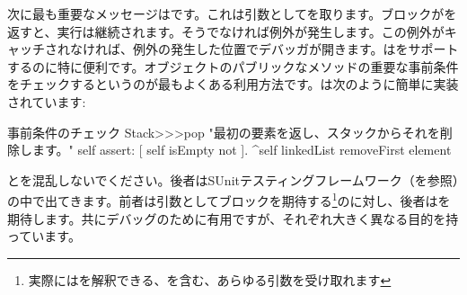 \documentclass[a4paper,10pt,twoside]{book}
\begin{document}

次に最も重要なメッセージはです。これは引数としてを取ります。ブロックがを返すと、実行は継続されます。そうでなければ例外が発生します。この例外がキャッチされなければ、例外の発生した位置でデバッガが開きます。はをサポートするのに特に便利です。オブジェクトのパブリックなメソッドの重要な事前条件をチェックするというのが最もよくある利用方法です。は次のように簡単に実装されています:

\begin{method}{事前条件のチェック}
Stack>>>pop
    "最初の要素を返し、スタックからそれを削除します。"
    self assert: [ self isEmpty not ].
    ^self linkedList removeFirst element
\end{method}

とを混乱しないでください。後者はSUnitテスティングフレームワーク（を参照）の中で出てきます。前者は引数としてブロックを期待する\footnote{実際にはを解釈できる、を含む、あらゆる引数を受け取れます}のに対し、後者はを期待します。共にデバッグのために有用ですが、それぞれ大きく異なる目的を持っています。
\end{document}
